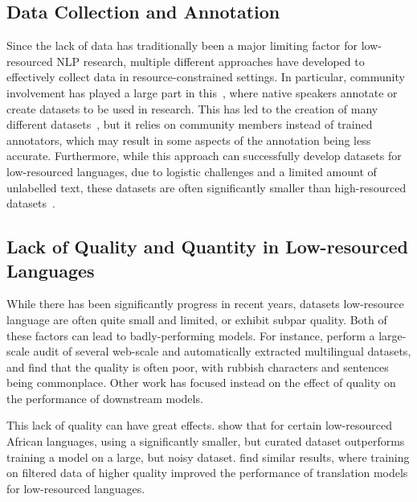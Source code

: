 \documentclass{article}
\begin{document}
\subsection{Data Collection and Annotation}
Since the lack of data has traditionally been a major limiting factor for low-resourced NLP research, multiple different approaches have developed to effectively collect data in resource-constrained settings. In particular, community involvement has played a large part in this~\citep{nekoto2020Participatory,nekoto2022Participatory}, where native speakers annotate or create datasets to be used in research. This has led to the creation of many different datasets~\citep{adelani2021MasakhaNER,nekoto2022Participatory}, but it relies on community members instead of trained annotators, which may result in some aspects of the annotation being less accurate. Furthermore, while this approach can successfully develop datasets for low-resourced languages, due to logistic challenges and a limited amount of unlabelled text, these datasets are often significantly smaller than high-resourced datasets~\citep{conneau2019Unsupervised,adelani2021MasakhaNER}.

\subsection{Lack of Quality and Quantity in Low-resourced Languages}
While there has been significantly progress in recent years, datasets low-resource language are often quite small and limited, or exhibit subpar quality. Both of these factors can lead to badly-performing models. 
For instance, \citet{kreutzer2021Quality} perform a large-scale audit of several web-scale and automatically extracted multilingual datasets, and find that the quality is often poor, with rubbish characters and sentences being commonplace. Other work has focused instead on the effect of quality on the performance of downstream models.

This lack of quality can have great effects. \citet{alabi2019Massive} show that for certain low-resourced African languages, using a significantly smaller, but curated dataset outperforms training a model on a large, but noisy dataset. \citet{abdulmumin2022Separating} find similar results, where training on filtered data of higher quality improved the performance of translation models for low-resourced languages.
\end{document}
